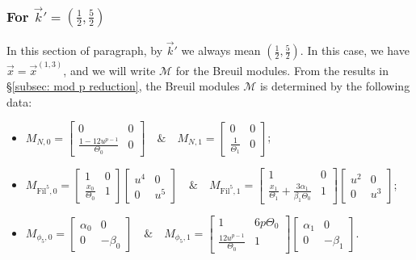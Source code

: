 \documentclass[11pt]{amsart}
\theoremstyle{definition}
\numberwithin{equation}{subsection}
\theoremstyle{plain}
\theoremstyle{plain}
\theoremstyle{plain}
\theoremstyle{plain}
\theoremstyle{plain}
\theoremstyle{plain}
\theoremstyle{plain}
\theoremstyle{plain}
\theoremstyle{plain}
\theoremstyle{plain}
\theoremstyle{plain}
\theoremstyle{plain}
\theoremstyle{definition}
\theoremstyle{definition}
\theoremstyle{definition}
\theoremstyle{remark}
\renewcommand{\(}{\textup{(}}
\renewcommand{\)}{\textup{)}}
\newcommand{\cM}{\mathcal{M}}
\newcommand{\Fil}{\mathrm{Fil}}
\newcommand{\vx}{\vec{x}}
\newcommand{\vk}{\vec{k}}
\begin{document}
\subsubsection{\textbf{For $\vk'=(\frac{1}{2},\frac{5}{2})$}}\label{subsubsec: vr=(1,5), vk=(1/2,5/2)}
In this section of paragraph, by $\vk'$ we always mean $(\frac{1}{2},\frac{5}{2})$. In this case, we have $\vx=\vx^{(1,3)}$, and we will write $\cM$ for the Breuil modules. From the results in \S\ref{subsec: mod p reduction}, the Breuil modules $\cM$ is determined by the following data:
\begin{itemize}[leftmargin=*]
  \item $M_{N,0}=
  \begin{bmatrix}
    0 & 0 \\
    \frac{1-12u^{p-1}}{\Theta_0} & 0
  \end{bmatrix}\quad\&\quad
  M_{N,1}=
  \begin{bmatrix}
    0 & 0 \\
    \frac{1}{\Theta_1} & 0
  \end{bmatrix}$;
  \item $M_{\Fil^5,0}=
  \begin{bmatrix}
    1 & 0 \\
    \frac{x_0}{\Theta_0} & 1
  \end{bmatrix}
  \begin{bmatrix}
    u^4 & 0 \\
    0 & u^5
  \end{bmatrix}\quad\&\quad
  M_{\Fil^5,1}=
  \begin{bmatrix}
    1 & 0 \\
    \frac{x_1}{\Theta_1}+\frac{3\alpha_1}{\beta_1\Theta_0} & 1
  \end{bmatrix}
  \begin{bmatrix}
    u^2 & 0 \\
    0 & u^3
  \end{bmatrix}$;
  \item $M_{\phi_5,0}=
  \begin{bmatrix}
    \alpha_0 & 0 \\
    0 & -\beta_0
  \end{bmatrix}\quad\&\quad
  M_{\phi_5,1}=
  \begin{bmatrix}
    1 & 6p\Theta_0 \\
    \frac{12u^{p-1}}{\Theta_0} & 1
  \end{bmatrix}
  \begin{bmatrix}
    \alpha_1 & 0 \\
    0 & -\beta_1
  \end{bmatrix}.$
\end{itemize}
\end{document}
